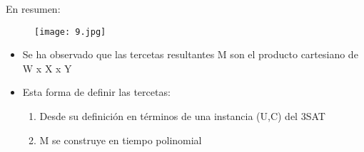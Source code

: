 \documentclass[a4paper,10pt]{article}
\begin{document}
\begin{itemize}
				En resumen:
				\begin{figure}[h!]
					\texttt{[image: 9.jpg]}
				\end{figure}
				\begin{itemize}
					\item Se ha observado que las tercetas resultantes M son el producto cartesiano de W x X x Y
					\item Esta forma de definir las tercetas:
						\begin{enumerate}
							\item Desde su definición en términos de una instancia (U,C) del 3SAT 
							\item M se construye en tiempo polinomial
						\end{enumerate}
				\end{itemize}
				

\end{itemize}
\end{document}

